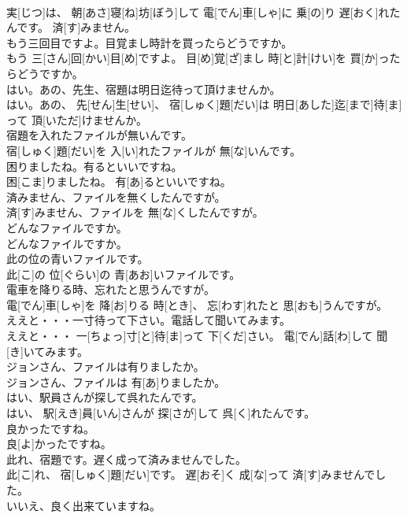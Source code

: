\documentclass[8pt]{extreport}
\begin{document}
\begin{CJK}{UTF8}{min}
\\	実[じつ]は、 朝[あさ]寝[ね]坊[ぼう]して 電[でん]車[しゃ]に 乗[の]り 遅[おく]れたんです。 済[す]みません。
\\	もう三回目ですよ。目覚まし時計を買ったらどうですか。	
\\	もう 三[さん]回[かい]目[め]ですよ。 目[め]覚[ざ]まし 時[と]計[けい]を 買[か]ったらどうですか。
\\	はい。あの、先生、宿題は明日迄待って頂けませんか。	
\\	はい。あの、 先[せん]生[せい]、 宿[しゅく]題[だい]は 明日[あした]迄[まで]待[ま]って 頂[いただ]けませんか。
\\	宿題を入れたファイルが無いんです。	
\\	宿[しゅく]題[だい]を 入[い]れたファイルが 無[な]いんです。
\\	困りましたね。有るといいですね。	
\\	困[こま]りましたね。 有[あ]るといいですね。
\\	済みません、ファイルを無くしたんですが。	
\\	済[す]みません、ファイルを 無[な]くしたんですが。
\\	どんなファイルですか。	
\\	どんなファイルですか。
\\	此の位の青いファイルです。	
\\	此[こ]の 位[ぐらい]の 青[あお]いファイルです。
\\	電車を降りる時、忘れたと思うんですが。	
\\	電[でん]車[しゃ]を 降[お]りる 時[とき]、 忘[わす]れたと 思[おも]うんですが。
\\	ええと・・・一寸待って下さい。電話して聞いてみます。	
\\	ええと・・・ 一[ちょっ]寸[と]待[ま]って 下[くだ]さい。 電[でん]話[わ]して 聞[き]いてみます。
\\	ジョンさん、ファイルは有りましたか。	
\\	ジョンさん、ファイルは 有[あ]りましたか。
\\	はい、駅員さんが探して呉れたんです。	
\\	はい、 駅[えき]員[いん]さんが 探[さが]して 呉[く]れたんです。
\\	良かったですね。	
\\	良[よ]かったですね。
\\	此れ、宿題です。遅く成って済みませんでした。	
\\	此[こ]れ、 宿[しゅく]題[だい]です。 遅[おそ]く 成[な]って 済[す]みませんでした。
\\	いいえ、良く出来ていますね。	

\end{CJK}
\end{document}
